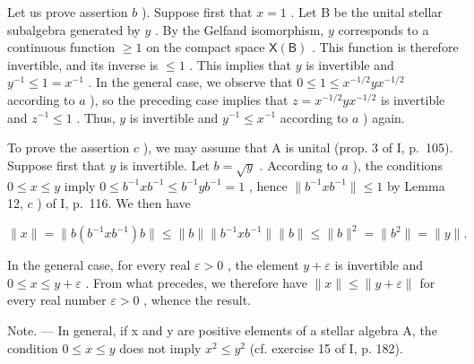 Let us prove assertion \(b\) ). Suppose first that \(x = 1\) . Let B be the unital stellar subalgebra generated by \(y\) . By the Gelfand isomorphism, \(y\) corresponds to a continuous function \(\geqslant 1\) on the compact space \(\mathsf{X}(\mathsf{B})\) . This function is therefore invertible, and its inverse is \(\leqslant 1\) . This implies that \(y\) is invertible and \(y^{-1} \leqslant 1 = x^{-1}\) . In the general case, we observe that \(0 \leqslant 1 \leqslant x^{-1/2}yx^{-1/2}\) according to \(a\) ), so the preceding case implies that \(z = x^{-1/2}yx^{-1/2}\) is invertible and \(z^{-1} \leqslant 1\) . Thus, \(y\) is invertible and \(y^{-1} \leqslant x^{-1}\) according to \(a\) ) again.

To prove the assertion \(c\) ), we may assume that A is unital (prop. 3 of I, p.~105). Suppose first that \(y\) is invertible. Let \(b = \sqrt{y}\) . According to \(a\) ), the conditions \(0 \leqslant x \leqslant y\) imply \(0 \leqslant b^{-1}xb^{-1} \leqslant b^{-1}yb^{-1} = 1\) , hence \(\|b^{-1}xb^{-1}\| \leqslant 1\) by Lemma 12, \(c\) ) of I, p.~116. We then have

\[
\| x \| = \| b (b ^ {- 1} x b ^ {- 1}) b \| \leqslant \| b \| \| b ^ {- 1} x b ^ {- 1} \| \| b \| \leqslant \| b \| ^ {2} = \| b ^ {2} \| = \| y \|.
\]

In the general case, for every real \(\varepsilon > 0\) , the element \(y + \varepsilon\) is invertible and \(0 \leqslant x \leqslant y + \varepsilon\) . From what precedes, we therefore have \(\|x\| \leqslant \|y + \varepsilon\|\) for every real number \(\varepsilon > 0\) , whence the result.

Note. --- In general, if x and y are positive elements of a stellar algebra A, the condition \(0 \leqslant x \leqslant y\) does not imply \(x^{2} \leqslant y^{2}\) (cf. exercise 15 of I, p. 182).


